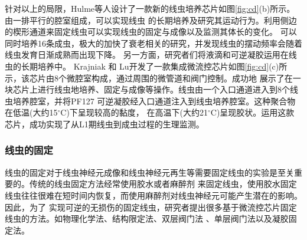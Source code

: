 	针对以上的局限，Hulme等人\cite{Hulme2010Lifespan}设计了一款新的线虫培养芯片如图\ref{fig:cd}(b)所示。
	由一排平行的腔室组成，可以实现线虫
	的长期培养及研究其运动行为。利用侧边的楔形通道来固定线虫可以实现线虫的固定与成像以及监测其体长的变化。
	可以同时培养16条成虫，极大的加快了衰老相关的研究，并发现线虫的摆动频率会随着线虫发育日渐成熟而出现下降。
	另一方面，研究者们将液滴和可逆凝胶运用在线虫的长期培养中\cite{Aubry2015Hydrogel,Krajniak2010Long,Wen2015A,Cornaglia2016Automated}。
	Krajniak 和 Lu\cite{Krajniak2010Long}开发了一款集成微流控芯片如图\ref{fig:cd}(c)所示，该芯片由8个微腔室构成，通过周围的微管道和阀门控制。成功地
	展示了在一块芯片上进行线虫地培养、固定与成像等操作。线虫由一个入口通道进入到8个线虫培养腔室，并将PF127
	可逆凝胶经入口通道注入到线虫培养腔室。这种聚合物在低温(大约15$^\circ$C)下呈现较高的黏度，
	在高温下(大约21$^\circ$C)呈现胶状。运用这款芯片，成功实现了从L1期线虫到成虫过程的生理监测。
\subsubsection{线虫的固定}
\label{sec:intro:analog}
	线虫的固定对于线虫神经元成像和线虫神经元再生\cite{Gokce2014A}等需要固定线虫的实验是至关重要的。传统的线虫固定方法经常使用胶水或者麻醉剂
	来固定线虫，使用胶水固定线虫往往很难在短时间内恢复，而使用麻醉剂对线虫神经元可能产生潜在的影响。因此，为了
	实现可逆的无损伤的固定线虫，研究者提出很多基于微流控芯片固定线虫的方法。如物理化学法、结构限定法、双层阀门法
	、单层阀门法以及凝胶固定法。
	
